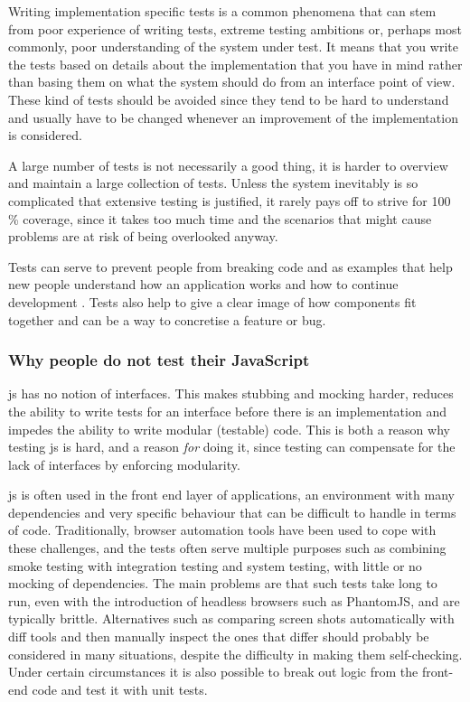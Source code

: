 \documentclass[11pt]{article}
\begin{document}
Writing implementation specific tests is a common phenomena that can stem from poor experience of writing tests, extreme testing ambitions or, perhaps most commonly, poor understanding of the system under test. It means that you write the tests based on details about the implementation that you have in mind rather than basing them on what the system should do from an interface point of view. These kind of tests should be avoided since they tend to be hard to understand and usually have to be changed whenever an improvement of the implementation is considered.

A large number of tests is not necessarily a good thing, it is harder to overview and maintain a large collection of tests. Unless the system inevitably is so complicated that extensive testing is justified, it rarely pays off to strive for 100 \% coverage, since it takes too much time and the scenarios that might cause problems are at risk of being overlooked anyway. \cite[question~28]{Edelstam}

Tests can serve to prevent people from breaking code and as examples that help new people understand how an application works and how to continue development \cite[questions~31-32]{Edelstam}. Tests also help to give a clear image of how components fit together and can be a way to concretise a feature or bug.

\subsubsection{Why people do not test their JavaScript}
\label{subsubsec:whynotjs}

\Gls{js} has no notion of interfaces. This makes stubbing and mocking harder, reduces the ability to write tests for an interface before there is an implementation and impedes the ability to write modular (testable) code. This is both a reason why testing \gls{js} is hard, and a reason \emph{for} doing it, since testing can compensate for the lack of interfaces by enforcing modularity.

\Gls{js} is often used in the front end layer of applications, an environment with many dependencies and very specific behaviour that can be difficult to handle in terms of code. Traditionally, browser automation tools have been used to cope with these challenges, and the tests often serve multiple purposes such as combining smoke testing with integration testing and system testing, with little or no mocking of dependencies. The main problems are that such tests take long to run, even with the introduction of headless browsers such as PhantomJS, and are typically brittle. Alternatives such as comparing screen shots automatically with diff tools and then manually inspect the ones that differ should probably be considered in many situations, despite the difficulty in making them self-checking. Under certain circumstances it is also possible to break out logic from the front-end code and test it with unit tests.
\end{document}
